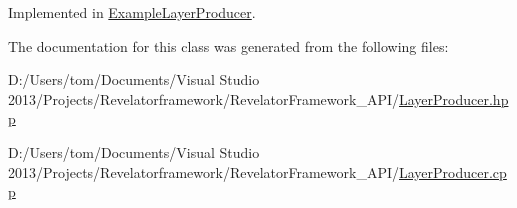 Implemented in \hyperlink{class_example_layer_producer_a580af18f887042b6ef9170f92ee14b8e}{Example\-Layer\-Producer}.



The documentation for this class was generated from the following files\-:\begin{DoxyCompactItemize}
\item 
D\-:/\-Users/tom/\-Documents/\-Visual Studio 2013/\-Projects/\-Revelatorframework/\-Revelator\-Framework\-\_\-\-A\-P\-I/\hyperlink{_layer_producer_8hpp}{Layer\-Producer.\-hpp}\item 
D\-:/\-Users/tom/\-Documents/\-Visual Studio 2013/\-Projects/\-Revelatorframework/\-Revelator\-Framework\-\_\-\-A\-P\-I/\hyperlink{_layer_producer_8cpp}{Layer\-Producer.\-cpp}\end{DoxyCompactItemize}
